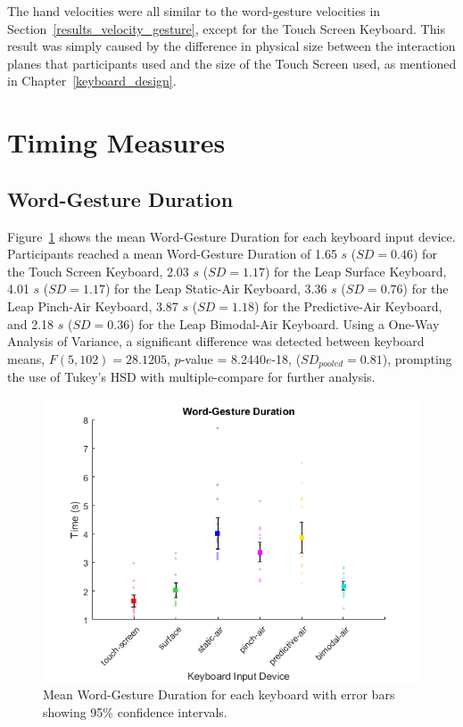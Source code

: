 The hand velocities were all similar to the word-gesture velocities in Section~\ref{results_velocity_gesture}, except for the Touch Screen Keyboard. This result was simply caused by the difference in physical size between the interaction planes that participants used and the size of the Touch Screen used, as mentioned in Chapter~\ref{keyboard_design}.

\section{Timing Measures}

\subsection{Word-Gesture Duration}
Figure~\ref{fig_time_mean} shows the mean Word-Gesture Duration for each keyboard input device. Participants reached a mean Word-Gesture Duration of 1.65 $s$ ($SD = 0.46$) for the Touch Screen Keyboard, 2.03 $s$ ($SD = 1.17$) for the Leap Surface Keyboard, 4.01 $s$ ($SD = 1.17$) for the Leap Static-Air Keyboard, 3.36 $s$ ($SD = 0.76$) for the Leap Pinch-Air Keyboard, 3.87 $s$ ($SD = 1.18$) for the Predictive-Air Keyboard, and 2.18 $s$ ($SD = 0.36$) for the Leap Bimodal-Air Keyboard. Using a One-Way Analysis of Variance, a significant difference was detected between keyboard means, $F(5, 102) = 28.1205$, $p$-value = 8.2440$e$-18, ($SD_{pooled} = 0.81$), prompting the use of Tukey's HSD with multiple-compare for further analysis.

\begin{figure}[h]
	\centering
	\includegraphics{fig_time_mean}
	\caption[Mean Word-Gesture Duration]{Mean Word-Gesture Duration for each keyboard with error bars showing 95\% confidence intervals.}
	\label{fig_time_mean}
\end{figure}

